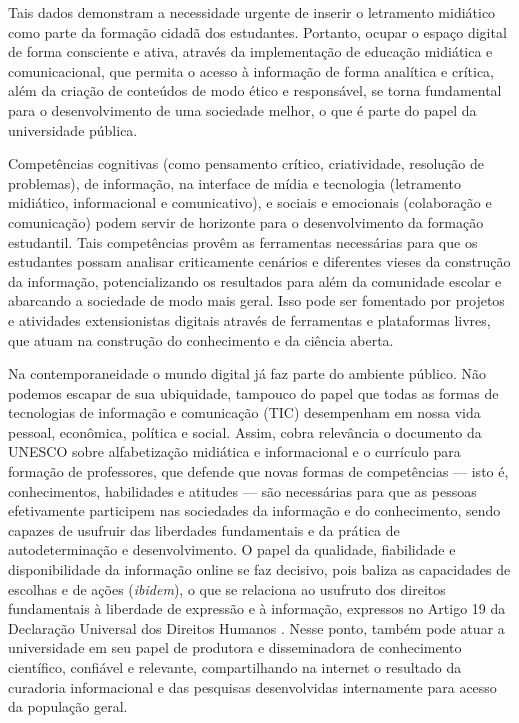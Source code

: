 \documentclass[portuguese]{textolivre}
\begin{document}
Tais dados demonstram a necessidade urgente de inserir o letramento
midiático como parte da formação cidadã dos estudantes. Portanto, ocupar
o espaço digital de forma consciente e ativa, através da implementação
de educação midiática e comunicacional, que permita o acesso à
informação de forma analítica e crítica, além da criação de conteúdos de
modo ético e responsável, se torna fundamental para o desenvolvimento de
uma sociedade melhor, o que é parte do papel da universidade pública.

Competências cognitivas (como pensamento crítico, criatividade,
resolução de problemas), de informação, na interface de mídia e
tecnologia (letramento midiático, informacional e comunicativo), e
sociais e emocionais (colaboração e comunicação) podem servir de
horizonte para o desenvolvimento da formação estudantil. Tais
competências provêm as ferramentas necessárias para que os estudantes
possam analisar criticamente cenários e diferentes vieses da construção
da informação, potencializando os resultados para além da comunidade
escolar e abarcando a sociedade de modo mais geral. Isso pode ser
fomentado por projetos e atividades extensionistas digitais através de
ferramentas e plataformas livres, que atuam na construção do
conhecimento e da ciência aberta.

Na contemporaneidade o mundo digital já faz parte do ambiente público.
Não podemos escapar de sua ubiquidade, tampouco do papel que todas as
formas de tecnologias de informação e comunicação (TIC) desempenham em
nossa vida pessoal, econômica, política e social. Assim, cobra
relevância o documento da UNESCO sobre alfabetização midiática e
informacional e o currículo para formação de professores, que defende
que novas formas de competências --- isto é, conhecimentos, habilidades
e atitudes --- são necessárias para que as pessoas efetivamente
participem nas sociedades da informação e do conhecimento, sendo capazes
de usufruir das liberdades fundamentais e da prática de autodeterminação
e desenvolvimento. O papel da qualidade, fiabilidade e disponibilidade
da informação online se faz decisivo, pois baliza as capacidades de
escolhas e de ações (\emph{ibidem}), o que se relaciona ao usufruto dos
direitos fundamentais à liberdade de expressão e à informação, expressos
no Artigo 19 da Declaração Universal dos Direitos Humanos
\cite{ONU2019}. Nesse ponto, também pode atuar a universidade em seu
papel de produtora e disseminadora de conhecimento científico, confiável
e relevante, compartilhando na internet o resultado da curadoria
informacional e das pesquisas desenvolvidas internamente para acesso da
população geral.
\end{document}
